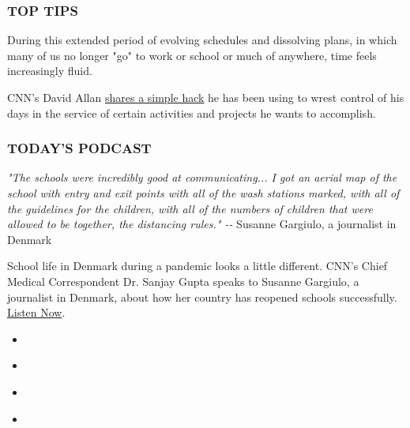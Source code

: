 \hypertarget{top-tips}{%
\subsubsection{\texorpdfstring{\textbf{TOP
TIPS}}{TOP TIPS}}\label{top-tips}}

During this extended period of evolving schedules and dissolving plans,
in which many of us no longer "go" to work or school or much of
anywhere, time feels increasingly fluid.

CNN's David Allan
\href{https://cnn.com/2020/08/06/health/time-saving-pomodoro-technique-wisdom-project-wellness/index.html}{shares
a simple hack} he has been using to wrest control of his days in the
service of certain activities and projects he wants to accomplish.

\hypertarget{todays-podcast}{%
\subsubsection{\texorpdfstring{\textbf{TODAY'S
PODCAST}}{TODAY'S PODCAST}}\label{todays-podcast}}

\emph{"The schools were incredibly good at communicating... I got an
aerial map of the school with entry and exit points with all of the wash
stations marked, with all of the guidelines for the children, with all
of the numbers of children that were allowed to be together, the
distancing rules." -\/-} Susanne Gargiulo, a journalist in Denmark

School life in Denmark during a pandemic looks a little different. CNN's
Chief Medical Correspondent Dr. Sanjay Gupta speaks to Susanne Gargiulo,
a journalist in Denmark, about how her country has reopened schools
successfully.
\href{https://edition.cnn.com/audio/podcasts/corona-virus}{Listen Now}.

\begin{itemize}
\item
\end{itemize}

\begin{itemize}
\item
\end{itemize}

\begin{itemize}
\item
\end{itemize}

\begin{itemize}
\item
\end{itemize}


